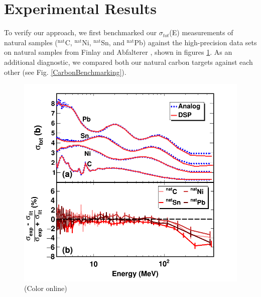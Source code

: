 \documentclass[twocolumn,secnumarabic,amssymb, nobibnotes, aps, prl,
superscriptaddress, nobalancelastpage]{revtex4}
\newcommand{\totEs}{\ensuremath{\sigma_{tot}}(E)\,\,}
\begin{document}
\section{Experimental Results}

To verify our approach, we first benchmarked our \totEs measurements of natural samples
($^{\text{nat}}$C, $^{\text{nat}}$Ni, $^{\text{nat}}$Sn, and
$^{\text{nat}}$Pb) against the high-precision data sets on natural samples from Finlay
\cite{Finlay1993} and Abfalterer \cite{Abfalterer2001}, shown in figures
\ref{LiteratureBenchmarking}. As an additional diagnostic, we compared both our natural 
carbon targets against each other (see Fig. \ref{CarbonBenchmarking}).

\begin{figure}
    \includegraphics[scale=0.35]{figures/LiteratureBenchmarking.png}
    \caption{(Color online) }
    \label{LiteratureBenchmarking}
\end{figure}
\end{document}

